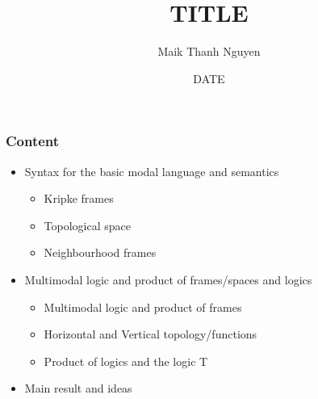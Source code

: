 \documentclass[hyperref={pdfpagelabels=false},t,10pt]{beamer}
\title{TITLE}
\author[© author]{Maik Thanh Nguyen}
\institute{Technische Universit\"at Dresden}
\date{DATE}
\begin{document}
\addtocounter{framenumber}{-1}
\maketitle

\begin{frame}
  \frametitle{Content}

  \begin{itemize}
  \item Syntax for the basic modal language and semantics
    \begin{itemize}
        \item Kripke frames
        \item Topological space
        \item Neighbourhood frames
     \end{itemize}
  \item Multimodal logic and product of frames/spaces and logics
    \begin{itemize}
      \item Multimodal logic and product of frames
      \item Horizontal and Vertical topology/functions
      \item Product of logics and the logic T
    \end{itemize}
  \item Main result and ideas
  \end{itemize}
\end{frame}
\end{document}
